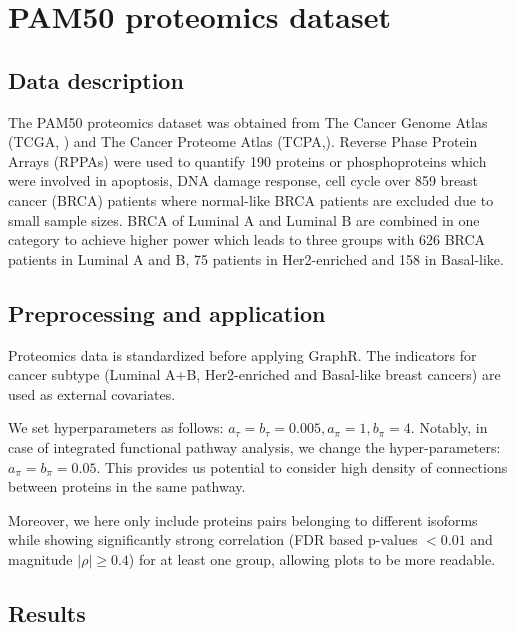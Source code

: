 \documentclass[
]{book}
\begin{document}
\hypertarget{PAM50}{%
\chapter{PAM50 proteomics dataset}\label{PAM50}}

\hypertarget{PAM50data}{%
\section{Data description}\label{PAM50data}}

The PAM50 \citep{parker2009supervised} proteomics dataset was obtained from The Cancer Genome Atlas (TCGA, \citet{weinstein2013cancer}) and The Cancer Proteome Atlas (TCPA,\citet{li2013tcpa}). Reverse Phase Protein Arrays (RPPAs) were used to quantify 190 proteins or phosphoproteins which were involved in apoptosis, DNA damage response, cell cycle \citep{akbani2014pan} over 859 breast cancer (BRCA) patients where normal-like BRCA patients are excluded due to small sample sizes. BRCA of Luminal A and Luminal B are combined in one category to achieve higher power which leads to three groups with 626 BRCA patients in Luminal A and B, 75 patients in Her2-enriched and 158 in Basal-like.

\hypertarget{PAM50process}{%
\section{Preprocessing and application}\label{PAM50process}}

Proteomics data is standardized before applying GraphR. The indicators for cancer subtype (Luminal A+B, Her2-enriched and Basal-like breast cancers) are used as external covariates.

We set hyperparameters as follows: \(a_\tau = b_\tau = 0.005,a_\pi = 1,b_\pi=4\). Notably, in case of integrated functional pathway analysis, we change the hyper-parameters: \(a_\pi = b_\pi = 0.05\). This provides us potential to consider high density of connections between proteins in the same pathway.

Moreover, we here only include proteins pairs belonging to different isoforms while showing significantly strong correlation (FDR based p-values \(<0.01\) and magnitude \(\mid \rho \mid \geq 0.4\)) for at least one group, allowing plots to be more readable.

\hypertarget{PAM50result}{%
\section{Results}\label{PAM50result}}
\end{document}
